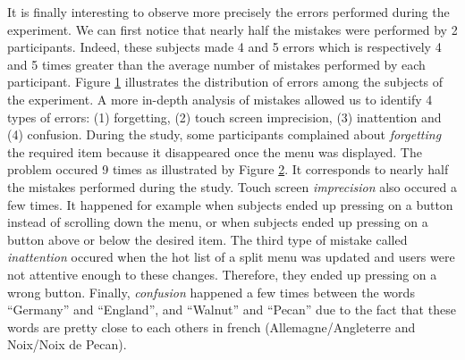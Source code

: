 \begin{figure}[!ht]
    
    \label{fig:errors_participants}
\end{figure}

It is finally interesting to observe more precisely the errors performed during 
the experiment. We can first notice that nearly half the mistakes were 
performed by 2 participants. Indeed, these subjects made 4 and 5 errors 
which is respectively 4 and 5 times greater than the average number of 
mistakes performed by each participant. Figure \ref{fig:errors_participants} 
illustrates the distribution of errors among the subjects of the 
experiment. A more in-depth analysis of mistakes allowed us to identify 4 
types of errors: (1) forgetting, (2) touch screen imprecision, (3) 
inattention and (4) confusion. During the study, some participants 
complained about \textit{forgetting} the required item because it disappeared 
once the menu was displayed. The problem occured 9 times as illustrated 
by Figure \ref{fig:errors_types}. It corresponds to nearly half the mistakes 
performed during the study. Touch screen \textit{imprecision} also occured a 
few times. It happened for example when subjects ended up pressing on a button 
instead of scrolling down the menu, or when subjects ended up pressing on a 
button above or below the desired item. The third type of mistake called 
\textit{inattention} occured when the hot list of a split menu was updated and
users were not attentive enough to these changes. Therefore, they ended up 
pressing on a wrong button. Finally, \textit{confusion} happened a few times 
between the words \enquote{Germany} and \enquote{England}, and \enquote{Walnut} 
and \enquote{Pecan} due to the fact that these words are pretty close to each 
others in french (Allemagne/Angleterre and Noix/Noix de Pecan).

\begin{figure}[!ht]
    
    \label{fig:errors_types}
\end{figure}

